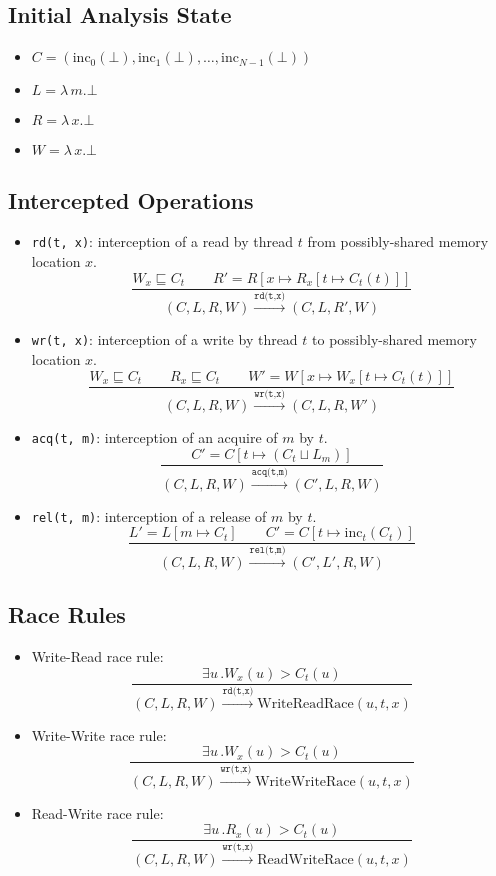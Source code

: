 \documentclass[twocolumn,landscape,10pt]{article}
\theoremstyle{definition}
\begin{document}
\subsection{Initial Analysis State}

\begin{itemize}
    \item
        $C=\left(\text{inc}_0(\bot),\text{inc}_1(\bot),\ldots,\text{inc}_{N-1}(\bot)\right)$
    \item $L=\lambda\, m.\bot$
    \item $R=\lambda\, x.\bot$
    \item $W=\lambda\, x.\bot$
\end{itemize} 

\subsection{Intercepted Operations}

\begin{itemize}
    \item \texttt{rd(t, x)}: interception of a read by thread $t$ 
        from possibly-shared memory location $x$.
        \[
            \frac{W_x\sqsubseteq C_t\qquad
            R'=R[x\mapsto R_x[t\mapsto C_t(t)]]}
            {(C,L,R,W)\xrightarrow{\texttt{rd(t,x)}}(C,L,R',W)}
        \]
    \item \texttt{wr(t, x)}: interception of a write by thread $t$ 
        to possibly-shared memory location $x$.
        \[
            \frac{W_x\sqsubseteq C_t\qquad
                R_x\sqsubseteq C_t \qquad
            W'=W[x\mapsto W_x[t\mapsto C_t(t)]]}
            {(C,L,R,W)\xrightarrow{\texttt{wr(t,x)}}(C,L,R,W')}
        \]
    \item \texttt{acq(t, m)}: interception of an acquire of $m$ by $t$.
        \[
            \frac{C'=C[t\mapsto (C_t\sqcup L_m)]}
            {(C,L,R,W)\xrightarrow{\texttt{acq(t,m)}}(C',L,R,W)}
        \]
    \item \texttt{rel(t, m)}: interception of a release of $m$ by $t$.
        \[
            \frac{L'=L[m\mapsto C_t]\qquad
            C'=C[t\mapsto \text{inc}_t(C_t)]}
            {(C,L,R,W)\xrightarrow{\texttt{rel(t,m)}}(C',L',R,W)}
        \]
\end{itemize} 

\subsection{Race Rules}

\begin{itemize}
    \item Write-Read race rule:
        \[
            \frac{\exists u\, .W_x(u)>C_t(u)}
        {(C,L,R,W)\xrightarrow{\texttt{rd(t,x)}}\text{WriteReadRace}(u,t,x)}
        \]
    \item Write-Write race rule:
        \[
            \frac{\exists u\, .W_x(u)>C_t(u)}
            {(C,L,R,W)\xrightarrow{\texttt{wr(t,x)}}\text{WriteWriteRace}(u,t,x)}
        \]
    \item Read-Write race rule:
        \[
            \frac{\exists u\, .R_x(u)>C_t(u)}
            {(C,L,R,W)\xrightarrow{\texttt{wr(t,x)}}\text{ReadWriteRace}(u,t,x)}
        \]
\end{itemize} 
\end{document}
